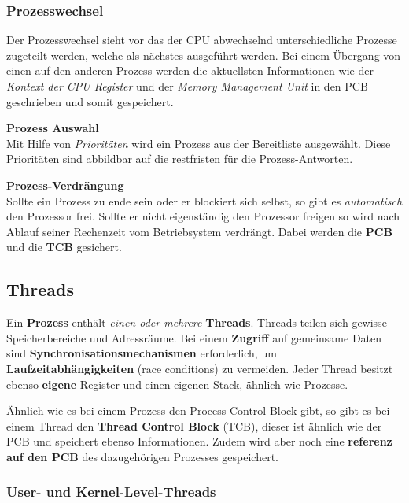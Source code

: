 \documentclass[10pt,a4paper]{article}
\begin{document}
\begin{multicols*}{4}
\subsubsection{Prozesswechsel}\label{subsubsec:prozesswechsel}
Der Prozesswechsel sieht vor das der CPU abwechselnd unterschiedliche Prozesse zugeteilt werden, welche als
nächstes ausgeführt werden. Bei einem Übergang von einen auf den anderen Prozess werden die aktuellsten
Informationen wie der \emph{Kontext der CPU Register} und der \emph{Memory Management Unit} in den PCB geschrieben
und somit gespeichert.

\textbf{Prozess Auswahl}\hfill\\
Mit Hilfe von \emph{Prioritäten} wird ein Prozess aus der Bereitliste ausgewählt. Diese Prioritäten sind abbildbar
auf die restfristen für die Prozess-Antworten.

\textbf{Prozess-Verdrängung}\hfill\\
Sollte ein Prozess zu ende sein oder er blockiert sich selbst, so gibt es \emph{automatisch} den Prozessor frei.
Sollte er nicht eigenständig den Prozessor freigen so wird nach Ablauf seiner Rechenzeit vom Betriebsystem
verdrängt. Dabei werden die \textbf{PCB} und die \textbf{TCB} gesichert.

\subsection{Threads}\label{subsec:threads}

Ein \textbf{Prozess} enthält \textit{einen oder mehrere} \textbf{Threads}. Threads teilen sich gewisse
Speicherbereiche und Adressräume. Bei einem \textbf{Zugriff} auf gemeinsame Daten sind
\textbf{Synchronisationsmechanismen} erforderlich, um \textbf{Laufzeitabhängigkeiten} (race conditions) zu vermeiden.
Jeder Thread besitzt ebenso \textbf{eigene} Register und einen eigenen Stack, ähnlich wie Prozesse.

Ähnlich wie es bei einem Prozess den Process Control Block gibt, so gibt es bei einem Thread den
\textbf{Thread Control Block} (TCB), dieser ist ähnlich wie der PCB und speichert ebenso Informationen. Zudem wird
aber noch eine \textbf{referenz auf den PCB} des dazugehörigen Prozesses gespeichert.

\subsubsection{User- und Kernel-Level-Threads}\label{subsubsec:user-kernel-level-threads}


\end{multicols*}
\end{document}
